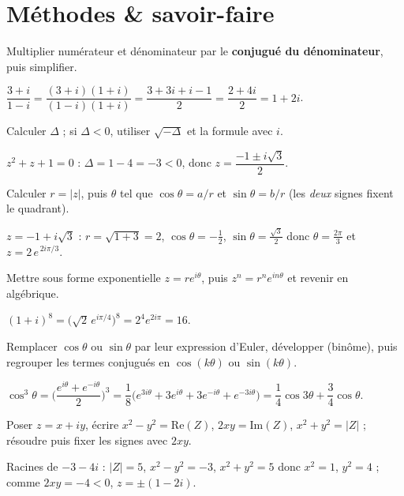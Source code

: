 \section{Méthodes \& savoir-faire}

Multiplier numérateur et dénominateur par le \textbf{conjugué du dénominateur}, puis simplifier.
\begin{exemple}
$\dfrac{3+i}{1-i}=\dfrac{(3+i)(1+i)}{(1-i)(1+i)}=\dfrac{3+3i+i-1}{2}=\dfrac{2+4i}{2}=1+2i$.
\end{exemple}

Calculer $\Delta$ ; si $\Delta<0$, utiliser $\sqrt{-\Delta}$ et la formule avec $i$.
\begin{exemple}
$z^{2}+z+1=0$ : $\Delta=1-4=-3<0$, donc $z=\dfrac{-1\pm i\sqrt3}{2}$.
\end{exemple}

Calculer $r=|z|$, puis $\theta$ tel que $\cos\theta=a/r$ et $\sin\theta=b/r$ (les \emph{deux}
signes fixent le quadrant).
\begin{exemple}
$z=-1+i\sqrt3$ : $r=\sqrt{1+3}=2$, $\cos\theta=-\frac12$, $\sin\theta=\frac{\sqrt3}2$ donc
$\theta=\frac{2\pi}3$ et $z=2\,e^{\,2i\pi/3}$.
\end{exemple}

Mettre sous forme exponentielle $z=re^{i\theta}$, puis $z^{n}=r^{n}e^{in\theta}$ et revenir en
algébrique.
\begin{exemple}
$(1+i)^{8}=\big(\sqrt2\,e^{i\pi/4}\big)^{8}=2^{4}e^{2i\pi}=16$.
\end{exemple}

Remplacer $\cos\theta$ ou $\sin\theta$ par leur expression d'Euler, développer (binôme), puis
regrouper les termes conjugués en $\cos(k\theta)$ ou $\sin(k\theta)$.
\begin{exemple}
$\cos^{3}\theta=\Big(\dfrac{e^{i\theta}+e^{-i\theta}}2\Big)^{3}
=\dfrac18\big(e^{3i\theta}+3e^{i\theta}+3e^{-i\theta}+e^{-3i\theta}\big)
=\dfrac14\cos3\theta+\dfrac34\cos\theta$.
\end{exemple}

Poser $z=x+iy$, écrire $x^{2}-y^{2}=\mathrm{Re}(Z)$, $2xy=\mathrm{Im}(Z)$, $x^{2}+y^{2}=|Z|$ ;
résoudre puis fixer les signes avec $2xy$.
\begin{exemple}
Racines de $-3-4i$ : $|Z|=5$, $x^{2}-y^{2}=-3$, $x^{2}+y^{2}=5$ donc $x^{2}=1$, $y^{2}=4$ ; comme
$2xy=-4<0$, $z=\pm(1-2i)$.
\end{exemple}

